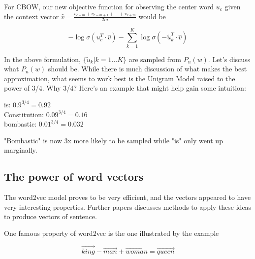 \documentclass[nobib]{tufte-handout}
\begin{document}
$$ $$ 

For CBOW, our new objective function for observing the center word $ u_c $ given the context vector $\hat{v} = \frac{v_{c-m}+v_{c-m+1}+... + v_{c+m}}{2m} $ would be

$$ - \log \sigma (u_{c}^{T}\cdot \hat{v}) -\sum_{k = 1}^K \log \sigma (- \tilde{u}_{k}^{T}\cdot \hat{v}) $$

In the above formulation, $\{\tilde{u}_{k} | k = 1\hdots K\}$ are sampled from $P_n(w)$. Let's discuss what $P_n(w)$ should be. While there is much discussion of what makes the best approximation, what seems to work best is the Unigram Model raised to the power of 3/4. Why 3/4? Here's an example that might help gain some intuition:\\
\begin{center}
is: $0.9^{3/4} = 0.92$\\
Constitution: $0.09^{3/4} = 0.16$\\
bombastic: $0.01^{3/4} = 0.032$\\
\end{center}

"Bombastic" is now 3x more likely to be sampled while "is" only went up marginally.

\subsection{The power of word vectors}
The word2vec model proves to be very efficient, and the vectors appeared to have very interesting properties. Further papers discusses methods to apply these ideas to produce vectors of sentence.

One famous property of word2vec is the one illustrated by the example 

$$ \overrightarrow{king} - \overrightarrow{man} + \overrightarrow{woman} = \overrightarrow{queen} $$
\end{document}
